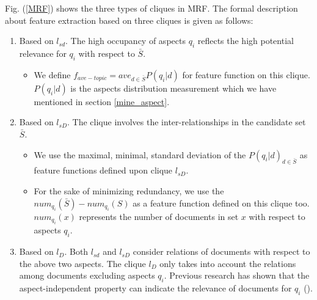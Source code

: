 \documentclass[review]{elsarticle}
\begin{document}
Fig. (\ref{MRF}) shows the three types of cliques in MRF. The formal description about feature extraction based on three cliques is given as follows:
\begin{enumerate}
	\item Based on $l_{sd}$. The high occupancy of aspects $q_i$ reflects the high potential relevance for $q_i$ with respect to $\bar{S}$.

		\begin{itemize}
			\item We define $f_{ave-topic}=ave_{d\in \bar{S}}P(q_i|d)$ for feature function on this clique. $P(q_i|d)$ is the aspects distribution measurement which we have mentioned in section \ref{mine_aspect}.
		\end{itemize}
	\item Based on $l_{sD}$. The clique involves the inter-relationships in the candidate set $\bar{S}$.
		\begin{itemize}
			\item We use the maximal, minimal, standard deviation of the $P(q_i|d)_{d\in \bar{S}}$ as feature functions defined upon clique $l_{sD}$.
			\item For the sake of minimizing redundancy, we use the $num_{q_i}(\bar{S})-num_{q_i}(S)$ as a feature function defined on this clique too. $num_{q_i}(x)$ represents the number of documents in set $x$ with respect to aspects $q_i$.
		\end{itemize}
	\item Based on $l_D$. Both $l_{sd}$ and $l_{sD}$ consider relations of documents with respect to the above two aspects. The clique $l_D$ only takes into account the relations among documents excluding aspects $q_i$. Previous research has shown that the aspect-independent property can indicate the relevance of documents for $q_i$ (\cite{kurland2008rank}).

\end{enumerate}
\end{document}

